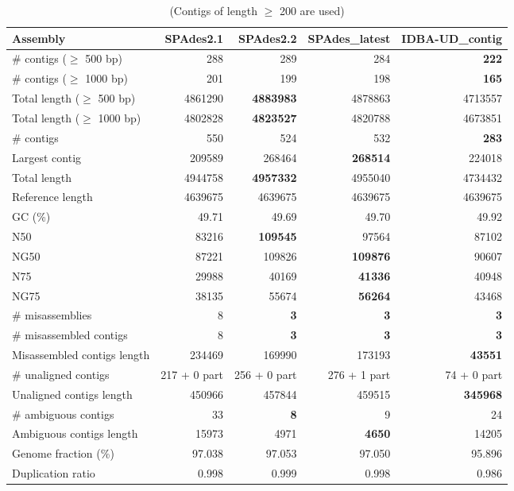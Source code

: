 \documentclass[12pt,a4paper]{article}
\begin{document}
\begin{table}[ht]
\begin{center}
\caption{(Contigs of length $\geq$ 200 are used)}
\begin{tabular}{|l*{4}{|r}|}
\hline
Assembly & SPAdes2.1 & SPAdes2.2 & SPAdes\_latest & IDBA-UD\_contig \\ \hline
\# contigs ($\geq$ 500 bp) & 288 & 289 & 284 & {\bf 222} \\ \hline
\# contigs ($\geq$ 1000 bp) & 201 & 199 & 198 & {\bf 165} \\ \hline
Total length ($\geq$ 500 bp) & 4861290 & {\bf 4883983} & 4878863 & 4713557 \\ \hline
Total length ($\geq$ 1000 bp) & 4802828 & {\bf 4823527} & 4820788 & 4673851 \\ \hline
\# contigs & 550 & 524 & 532 & {\bf 283} \\ \hline
Largest contig & 209589 & 268464 & {\bf 268514} & 224018 \\ \hline
Total length & 4944758 & {\bf 4957332} & 4955040 & 4734432 \\ \hline
Reference length & 4639675 & 4639675 & 4639675 & 4639675 \\ \hline
GC (\%) & 49.71 & 49.69 & 49.70 & 49.92 \\ \hline
N50 & 83216 & {\bf 109545} & 97564 & 87102 \\ \hline
NG50 & 87221 & 109826 & {\bf 109876} & 90607 \\ \hline
N75 & 29988 & 40169 & {\bf 41336} & 40948 \\ \hline
NG75 & 38135 & 55674 & {\bf 56264} & 43468 \\ \hline
\# misassemblies & 8 & {\bf 3} & {\bf 3} & {\bf 3} \\ \hline
\# misassembled contigs & 8 & {\bf 3} & {\bf 3} & {\bf 3} \\ \hline
Misassembled contigs length & 234469 & 169990 & 173193 & {\bf 43551} \\ \hline
\# unaligned contigs & 217 + 0 part & 256 + 0 part & 276 + 1 part & 74 + 0 part \\ \hline
Unaligned contigs length & 450966 & 457844 & 459515 & {\bf 345968} \\ \hline
\# ambiguous contigs & 33 & {\bf 8} & 9 & 24 \\ \hline
Ambiguous contigs length & 15973 & 4971 & {\bf 4650} & 14205 \\ \hline
Genome fraction (\%) & 97.038 & 97.053 & 97.050 & 95.896 \\ \hline
Duplication ratio & 0.998 & 0.999 & 0.998 & 0.986 \\ \hline

\end{tabular}
\end{center}
\end{table}
\end{document}
